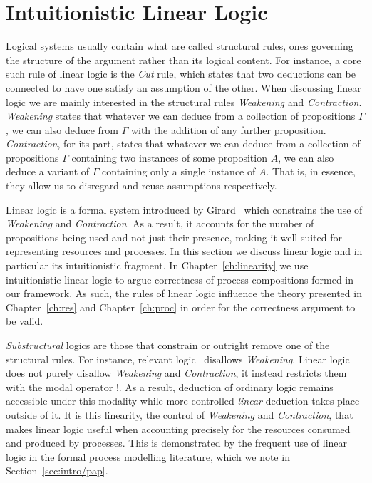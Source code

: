 \documentclass[class=smolathesis,crop=false]{standalone}
\begin{document}
\section{Intuitionistic Linear Logic}
\label{sec:intro/ill}

Logical systems usually contain what are called structural rules, ones governing the structure of the argument rather than its logical content.
For instance, a core such rule of linear logic is the \emph{Cut} rule, which states that two deductions can be connected to have one satisfy an assumption of the other.
When discussing linear logic we are mainly interested in the structural rules \emph{Weakening} and \emph{Contraction}.
\emph{Weakening} states that whatever we can deduce from a collection of propositions $\Gamma$, we can also deduce from $\Gamma$ with the addition of any further proposition.
\emph{Contraction}, for its part, states that whatever we can deduce from a collection of propositions $\Gamma$ containing two instances of some proposition $A$, we can also deduce a variant of $\Gamma$ containing only a single instance of $A$.
That is, in essence, they allow us to disregard and reuse assumptions respectively.

Linear logic is a formal system introduced by Girard~\cite{girard-1987} which constrains the use of \emph{Weakening} and \emph{Contraction}.
As a result, it accounts for the number of propositions being used and not just their presence, making it well suited for representing resources and processes.
In this section we discuss linear logic and in particular its intuitionistic fragment.
In Chapter~\ref{ch:linearity} we use intuitionistic linear logic to argue correctness of process compositions formed in our framework.
As such, the rules of linear logic influence the theory presented in Chapter~\ref{ch:res} and Chapter~\ref{ch:proc} in order for the correctness argument to be valid.

\emph{Substructural} logics are those that constrain or outright remove one of the structural rules.
For instance, relevant logic~\cite{dunn-1986} disallows \emph{Weakening}.
Linear logic does not purely disallow \emph{Weakening} and \emph{Contraction}, it instead restricts them with the modal operator $!$.
As a result, deduction of ordinary logic remains accessible under this modality while more controlled \emph{linear} deduction takes place outside of it.
It is this linearity, the control of \emph{Weakening} and \emph{Contraction}, that makes linear logic useful when accounting precisely for the resources consumed and produced by processes.
This is demonstrated by the frequent use of linear logic in the formal process modelling literature, which we note in Section~\ref{sec:intro/pap}.
\end{document}
